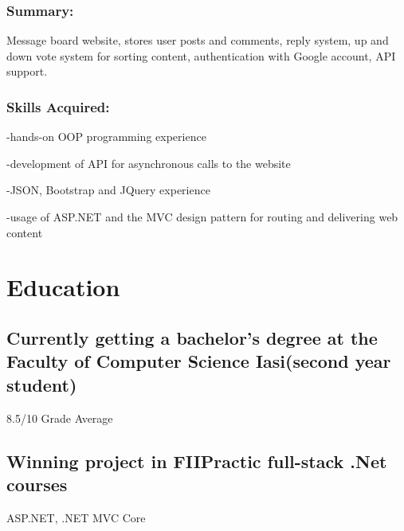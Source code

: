 \documentclass[a4paper,hidelinks,8pt]{article}
\begin{document}
\subsubsection{Summary:}
Message board website, stores user posts and comments, reply system, up and down vote system for sorting content, authentication with Google account, API support.
\subsubsection{Skills Acquired:}
-hands-on OOP programming experience

-development of API for asynchronous calls to the website

-JSON, Bootstrap and JQuery experience

-usage of ASP.NET and the MVC design pattern for routing and delivering web content

\section{Education}
\subsection{Currently getting a bachelor's degree at 
the Faculty of Computer Science Iasi(second year student)}
 8.5/10 Grade Average

\subsection{Winning project in FIIPractic full-stack .Net courses}
ASP.NET, .NET MVC Core
\end{document}
